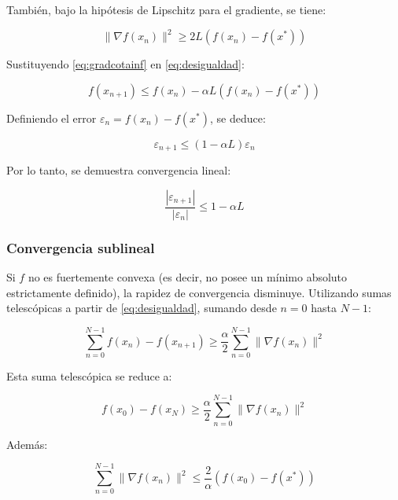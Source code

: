 \documentclass[conference]{IEEEtran}
\begin{document}
También, bajo la hipótesis de Lipschitz para el gradiente, se tiene:

\begin{equation}
\|\nabla f(x_n)\|^2 \geq 2L (f(x_n) - f(x^*)) \label{eq:gradcotainf}
\end{equation}

Sustituyendo \eqref{eq:gradcotainf} en \eqref{eq:desigualdad}:

\begin{equation}
f(x_{n+1}) \leq f(x_n) - \alpha L (f(x_n) - f(x^*))
\end{equation}

Definiendo el error $\varepsilon_n = f(x_n) - f(x^*)$, se deduce:

\begin{equation}
\varepsilon_{n+1} \leq (1 - \alpha L)\varepsilon_n
\end{equation}

Por lo tanto, se demuestra convergencia lineal:

\begin{equation}
\boxed{\frac{|\varepsilon_{n+1}|}{|\varepsilon_n|} \leq 1 - \alpha L}
\end{equation}

\subsubsection{Convergencia sublineal}

Si $f$ no es fuertemente convexa (es decir, no posee un mínimo absoluto estrictamente definido), la rapidez de convergencia disminuye. Utilizando sumas telescópicas a partir de \eqref{eq:desigualdad}, sumando desde $n = 0$ hasta $N-1$:

\begin{equation}
\sum_{n=0}^{N-1} f(x_n) - f(x_{n+1}) \geq \frac{\alpha}{2} \sum_{n=0}^{N-1} \|\nabla f(x_n)\|^2
\end{equation}

Esta suma telescópica se reduce a:

\begin{equation}
f(x_0) - f(x_N) \geq \frac{\alpha}{2} \sum_{n=0}^{N-1} \|\nabla f(x_n)\|^2
\end{equation}

Además:

\begin{equation}
\sum_{n=0}^{N-1} \|\nabla f(x_n)\|^2 \leq \frac{2}{\alpha} (f(x_0) - f(x^*))
\end{equation}
\end{document}
